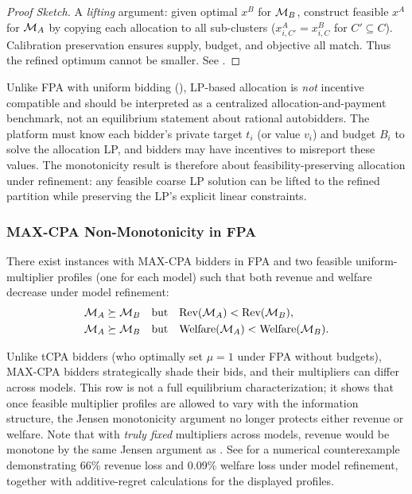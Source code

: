 \begin{proof}[Proof Sketch]
A \emph{lifting} argument: given optimal $x^B$ for $\mathcal{M}_B$, construct feasible $x^A$ for $\mathcal{M}_A$ by copying each allocation to all sub-clusters ($x^A_{i,C'} = x^B_{i,C}$ for $C' \subseteq C$). Calibration preservation ensures supply, budget, and objective all match. Thus the refined optimum cannot be smaller. See .
\end{proof}

\begin{remark}
\label{rem:lp-ic}
Unlike FPA with uniform bidding (), LP-based allocation is \emph{not} incentive compatible and should be interpreted as a centralized allocation-and-payment benchmark, not an equilibrium statement about rational autobidders. The platform must know each bidder's private target $t_i$ (or value $v_i$) and budget $B_i$ to solve the allocation LP, and bidders may have incentives to misreport these values. The monotonicity result is therefore about feasibility-preserving allocation under refinement: any feasible coarse LP solution can be lifted to the refined partition while preserving the LP's explicit linear constraints.
\end{remark}

\subsubsection{MAX-CPA Non-Monotonicity in FPA}

\begin{theorem}
\label{thm:fpa-maxcpa-nonmono}
There exist instances with MAX-CPA bidders in FPA and two feasible uniform-multiplier profiles (one for each model) such that both revenue and welfare decrease under model refinement:
\begin{align}
\mathcal{M}_A \succeq \mathcal{M}_B \quad \text{but} \quad &\text{Rev}(\mathcal{M}_A) < \text{Rev}(\mathcal{M}_B), \\
\mathcal{M}_A \succeq \mathcal{M}_B \quad \text{but} \quad &\text{Welfare}(\mathcal{M}_A) < \text{Welfare}(\mathcal{M}_B).
\end{align}
\end{theorem}

Unlike tCPA bidders (who optimally set $\mu = 1$ under FPA without budgets), MAX-CPA bidders strategically shade their bids, and their multipliers can differ across models. This row is not a full equilibrium characterization; it shows that once feasible multiplier profiles are allowed to vary with the information structure, the Jensen monotonicity argument no longer protects either revenue or welfare. Note that with \emph{truly fixed} multipliers across models, revenue would be monotone by the same Jensen argument as . See  for a numerical counterexample demonstrating 66\% revenue loss and 0.09\% welfare loss under model refinement, together with additive-regret calculations for the displayed profiles.

